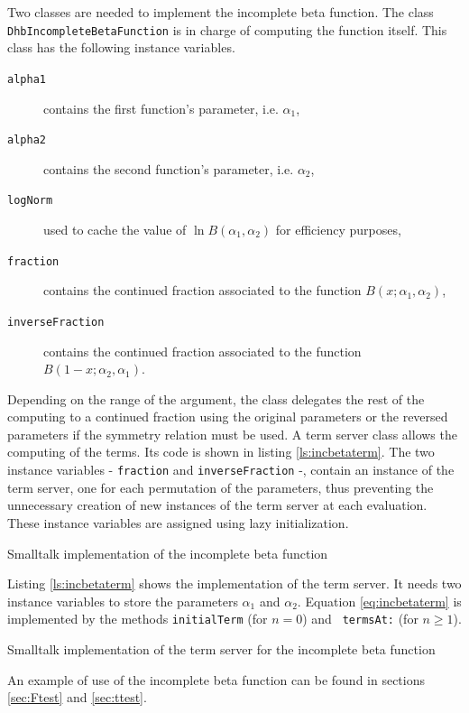 \documentclass[twoside]{book}
\begin{document}
Two classes are needed to implement the incomplete beta function.
The class {\tt DhbIncompleteBetaFunction} is in charge of
computing the function itself. This class has the following
instance variables.
\begin{description}
\item[\tt alpha1]contains the first function's parameter, i.e.
$\alpha_1$,
\item[\tt alpha2]contains the second function's parameter, i.e.
$\alpha_2$,
\item[\tt logNorm]used to cache the value of $\ln B\left(\alpha_1,\alpha_2\right)$ for efficiency
purposes,
\item[\tt fraction]contains the continued fraction associated to the
function $B\left(x;\alpha_1,\alpha_2\right)$,
\item[\tt inverseFraction]contains the continued fraction associated to the
function $B\left(1-x;\alpha_2,\alpha_1\right)$.
\end{description}
Depending on the range of the argument, the class delegates the
rest of the computing to a continued fraction using the original
parameters or the reversed parameters if the symmetry relation
must be used. A term server class allows the computing of the
terms. Its code is shown in listing \ref{ls:incbetaterm}. The two
instance variables - {\tt fraction} and {\tt inverseFraction} -,
contain an instance of the term server, one for each permutation
of the parameters, thus preventing the unnecessary creation of new
instances of the term server at each evaluation. These instance
variables are assigned using lazy initialization.
\begin{listing} Smalltalk implementation of the incomplete beta function
\label{ls:incbeta}

\end{listing}
Listing \ref{ls:incbetaterm} shows the implementation of the term
server. It needs two instance variables to store the parameters
$\alpha_1$ and $\alpha_2$. Equation \ref{eq:incbetaterm} is
implemented by the methods {\tt initialTerm} (for $n=0$) and {\tt
termsAt:} (for $n\ge 1$).
\begin{listing} Smalltalk implementation of the term server for the incomplete beta function
\label{ls:incbetaterm}

\end{listing}
An example of use of the incomplete beta function can be found in
sections \ref{sec:Ftest} and \ref{sec:ttest}.


\ifx\wholebook\relax\else
\end{document}
